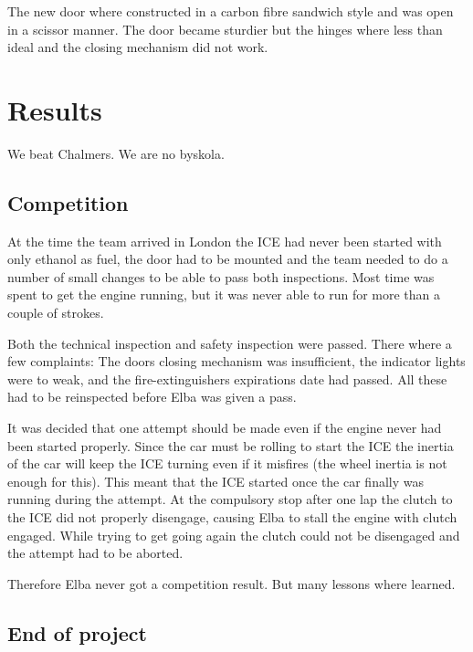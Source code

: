 The new door where constructed in a carbon fibre sandwich style and was open in
a scissor manner. The door became sturdier but the hinges where less than ideal
and the closing mechanism did not work.

\section{Results}
We beat Chalmers. We are no byskola.

\subsection{Competition}
At the time the team arrived in London the ICE had never been started with only
ethanol as fuel, the door had to be mounted and the team needed to do a number
of small changes to be able to pass both inspections. Most time was spent to get
the engine running, but it was never able to run for more than a couple of
strokes. 

Both the technical inspection and safety inspection were passed. There where a
few complaints: The doors closing mechanism was insufficient, the indicator
lights were to weak, and the fire-extinguishers expirations date had passed.
All these had to be reinspected before Elba was given a pass.

It was decided that one attempt should be made even if the engine never had been
started properly. Since the car must be rolling to start the ICE the inertia of
the car will keep the ICE turning even if it misfires (the wheel inertia is not
enough for this). This meant that the ICE started once the car finally was
running during the attempt. %
At the compulsory stop after one lap the clutch to the ICE did not properly
disengage, causing Elba to stall the engine with clutch engaged. While trying to
get going again the clutch could not be disengaged and the attempt had to be
aborted.

Therefore Elba never got a competition result. But many lessons where learned.

\subsection{End of project}

